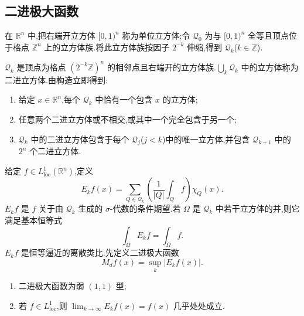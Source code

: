 \subsection{二进极大函数}
\label{sec:ch2-dyadic-maximal-function}

在 $\mathbb R^n$ 中,把右端开立方体 $[0,1)^n$ 称为单位立方体;令 $\mathcal Q_0$ 为与 $[0,1)^n$ 全等且顶点位于格点 $\mathbb Z^n$ 上的立方体族.将此立方体族按因子 $2^{-k}$ 伸缩,得到 $\mathcal Q_k$($k\in\mathbb Z$).

\hypertarget{sample-page-045}{}
$\mathcal Q_k$ 是顶点为格点 $(2^{-k}\mathbb Z)^n$ 的相邻点且右端开的立方体族.$\bigcup_k\mathcal Q_k$ 中的立方体称为二进立方体.由构造立即得到:

\begin{enumerate}[label=(\arabic*)]
\item 给定 $x\in\mathbb R^n$,每个 $\mathcal Q_k$ 中恰有一个包含 $x$ 的立方体;
\item 任意两个二进立方体或不相交,或其中一个完全包含于另一个;
\item $\mathcal Q_k$ 中的二进立方体包含于每个 $\mathcal Q_j$($j<k$)中的唯一立方体,并包含 $\mathcal Q_{k+1}$ 中的 $2^n$ 个二进立方体.
\end{enumerate}

给定 $f\in L^1_{\mathrm{loc}}(\mathbb R^n)$,定义
\[
 E_kf(x)=\sum_{Q\in\mathcal Q_k}\left(\frac1{|Q|}\int_Qf\right)\chi_Q(x).
\]
$E_kf$ 是 $f$ 关于由 $\mathcal Q_k$ 生成的 $\sigma$-代数的条件期望.若 $\Omega$ 是 $\mathcal Q_k$ 中若干立方体的并,则它满足基本恒等式
\[
 \int_\Omega E_kf=\int_\Omega f.
\]
$E_kf$ 是恒等逼近的离散类比.先定义二进极大函数
\begin{equation}
\label{eq:ch2-dyadic-maximal}
 M_df(x)=\sup_k|E_kf(x)|.
\end{equation}

\begin{Theorem}
\label{thm:ch2-dyadic-maximal}
\begin{enumerate}[label=(\arabic*)]
\item 二进极大函数为弱 $(1,1)$ 型;
\item 若 $f\in L^1_{\mathrm{loc}}$,则 $\lim_{k\to\infty}E_kf(x)=f(x)$ 几乎处处成立.
\end{enumerate}
\end{Theorem}


